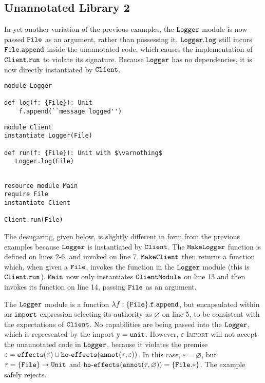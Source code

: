 \subsection{Unannotated Library 2}

In yet another variation of the previous examples, the $\mathtt{Logger}$ module is now passed $\mathtt{File}$ as an argument, rather than possessing it. $\mathtt{Logger.log}$ still incurs $\mathtt{File.append}$ inside the unannotated code, which causes the implementation of $\mathtt{Client.run}$ to violate its signature. Because $\mathtt{Logger}$ has no dependencies, it is now directly instantiated by $\mathtt{Client}$.

\begin{lstlisting}
module Logger

def log(f: {File}): Unit
    f.append(``message logged'')
\end{lstlisting}

\begin{lstlisting}
module Client
instantiate Logger(File)

def run(f: {File}): Unit with $\varnothing$
   Logger.log(File)
   
\end{lstlisting}

\begin{lstlisting}
resource module Main
require File
instantiate Client

Client.run(File)
\end{lstlisting}

The desugaring, given below, is slightly different in form from the previous examples because $\mathtt{Logger}$ is instantiated by $\mathtt{Client}$. The $\mathtt{MakeLogger}$ function is defined on lines 2-6, and invoked on line 7. $\mathtt{MakeClient}$ then returns a function which, when given a $\mathtt{File}$, invokes the function in the $\mathtt{Logger}$ module (this is $\mathtt{Client.run}$). $\mathtt{Main}$ now only instantiates $\mathtt{ClientModule}$ on line 13 and then invokes its function on line 14, passing $\mathtt{File}$ as an argument.

The $\mathtt{Logger}$ module is a function $\lambda f: \{\mathtt{File}\}. \mathtt{f.append}$, but encapsulated within an $\mathtt{import}$ expression selecting its authority as $\varnothing$ on line 5, to be consistent with the expectations of $\mathtt{Client}$. No capabilities are being passed into the $\mathtt{Logger}$, which is represented by the import $\mathtt{y = unit}$. However, \textsc{$\varepsilon$-Import} will not accept the unannotated code in $\mathtt{Logger}$, because it violates the premise $\varepsilon = \mathtt{effects}(\hat \tau) \cup \mathtt{ho \hbox{-} effects}(\mathtt{annot}(\tau, \varepsilon))$. In this case, $\varepsilon = \varnothing$, but $\tau = \mathtt{ \{ File \} \rightarrow Unit}$ and $\mathtt{ho \hbox{-} effects}(\mathtt{annot}(\tau, \varnothing)) = \{ \mathtt{File.*} \}$. The example safely rejects.

